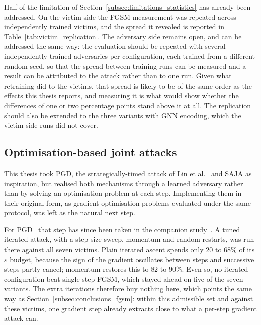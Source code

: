 Half of the limitation of Section~\ref{subsec:limitations_statistics} has already been
addressed. On the victim side the FGSM measurement was repeated across independently
trained victims, and the spread it revealed is reported in
Table~\ref{tab:victim_replication}. The adversary side remains open, and can be
addressed the same way: the evaluation should be repeated with several independently
trained adversaries per configuration, each trained from a different random seed, so
that the spread between training runs can be measured and a result can be attributed to
the attack rather than to one run. Given what retraining did to the victims, that spread
is likely to be of the same order as the effects this thesis reports, and measuring it
is what would show whether the differences of one or two percentage points stand above
it at all. The replication should also be extended to the three variants with GNN
encoding, which the victim-side runs did not cover.

\subsection{Optimisation-based joint attacks}
\label{subsec:future_optimisation}

This thesis took PGD, the strategically-timed attack of Lin et
al.~\cite{lin2019tacticsadversarialattackdeep} and SAJA as inspiration, but realised
both mechanisms through a learned adversary rather than by solving an optimisation
problem at each step. Implementing them in their original form, as gradient optimisation
problems evaluated under the same protocol, was left as the natural next step.

For PGD~\cite{madry2019deeplearningmodelsresistant} that step has since been taken in
the companion study~\cite{martins2026fgsm}. A tuned iterated attack, with a step-size
sweep, momentum and random restarts, was run there against all seven victims. Plain iterated ascent spends only $20$ to $68\%$ of its
$\varepsilon$ budget, because the sign of the gradient oscillates between steps and
successive steps partly cancel; momentum restores this to $82$ to $90\%$. Even so, no
iterated configuration beat single-step FGSM, which stayed ahead on five of the seven
variants. The extra iterations therefore buy nothing here, which points the same way as
Section~\ref{subsec:conclusions_fgsm}: within this admissible set and against these
victims, one gradient step already extracts close to what a per-step gradient attack
can.

